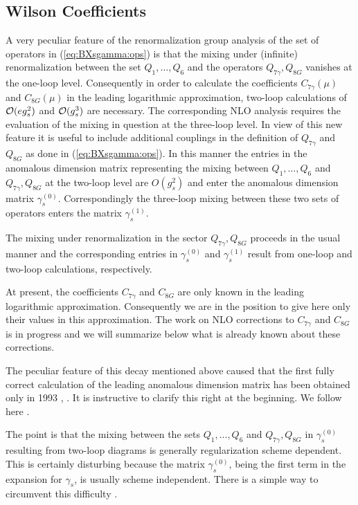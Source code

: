 \subsection{Wilson Coefficients}
         \label{sec:Heff:BXsgamma:wc}
A very peculiar feature of the renormalization group analysis of the
set of operators in (\ref{eq:BXsgamma:ops}) is that the mixing under
(infinite) renormalization between the set $Q_1,\ldots,Q_6$ and the
operators $Q_{7\gamma},Q_{8G}$ vanishes at the one-loop level.
Consequently in order to calculate the coefficients $C_{7\gamma}(\mu)$
and $C_{8G}(\mu)$ in the leading logarithmic approximation, two-loop
calculations of ${\cal{O}}(e g^2_s)$ and ${\cal{O}}(g^3_s)$ are
necessary. The corresponding NLO analysis requires the evaluation of
the mixing in question at the three-loop level. In view of this new
feature it is useful to include additional couplings in the definition
of $Q_{7\gamma}$ and $Q_{8G}$ as done in (\ref{eq:BXsgamma:ops}).  In
this manner the entries in the anomalous dimension matrix representing
the mixing between $Q_1,\ldots,Q_6$ and $Q_{7\gamma},Q_{8G}$ at the
two-loop level are $O(g_s^2)$ and enter the anomalous dimension matrix
$\gamma^{(0)}_s$. Correspondingly the three-loop mixing between these
two sets of operators enters the matrix $\gamma^{(1)}_s$.

The mixing under renormalization in the sector $Q_{7\gamma},Q_{8G}$
proceeds in the usual manner and the corresponding entries in
$\gamma^{(0)}_s $ and $\gamma^{(1)}_s$ result from one-loop and 
two-loop calculations, respectively.

At present, the coefficients $C_{7\gamma}$ and $C_{8G}$ are only known
in the leading logarithmic approximation. Consequently we are in the
position to give here only their values in this approximation.
The work on NLO corrections to $C_{7\gamma}$ and $C_{8G}$ is in
progress and we will summarize below what is already known about
these corrections.

The peculiar feature of this decay mentioned above caused that the
first fully correct calculation of the leading  anomalous dimension
matrix has been obtained only in 1993 \cite{CFMRS:93}, \cite{CFRS:94}.
It is instructive to clarify this right at the beginning. We follow
here \cite{BMMP:94}.

The point is that the mixing between the sets $Q_1,\ldots,Q_6$ and
$Q_{7\gamma},Q_{8G}$ in $\gamma^{(0)}_s$ resulting from two-loop
diagrams is generally regularization scheme dependent. This is
certainly disturbing because the matrix $\gamma^{(0)}_s$, being the
first term in the expansion for $\gamma_s$, is usually scheme
independent.  There is a simple way to circumvent this difficulty
\cite{BMMP:94}.

